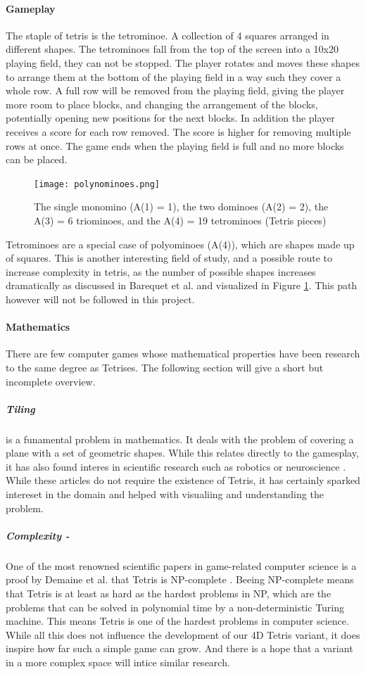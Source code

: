\documentclass{article}
\begin{document}
\paragraph{Gameplay}
The staple of tetris is the tetrominoe. A collection of 4 squares arranged in different shapes. The tetrominoes fall from the top of the screen into a 10x20 playing field, they can not be stopped. The player rotates and moves these shapes to arrange them at the bottom of the playing field in a way such they cover a whole row. A full row will be removed from the playing field, giving the player more room to place blocks, and changing the arrangement of the blocks, potentially opening new positions for the next blocks.
In addition the player receives a score for each row removed. The score is higher for removing multiple rows at once. The game ends when the playing field is full and no more blocks can be placed.
\begin{figure}
    \label{fig:poly}
    \centering
    \texttt{[image: polynominoes.png]}
    \caption{The single monomino (A(1) = 1),
    the two dominoes (A(2) = 2), the A(3) = 6
    triominoes, and the A(4) = 19 tetrominoes
    (Tetris pieces) \cite{polyominoes}}  
\end{figure}
Tetrominoes are a special case of polyominoes (A(4)), which are shapes made up of squares. This is another interesting field of study, and a possible route to increase complexity in tetris, as the number of possible shapes increases dramatically as discussed in Barequet et al.\cite{polyominoes} and visualized in Figure \ref{fig:poly}.
This path however will not be followed in this project.
\paragraph{Mathematics}
There are few computer games whose mathematical properties have been research to the same degree as Tetrises. The following section will give a short but incomplete overview.
\subparagraph*{Tiling} is a funamental problem in mathematics. It deals with the problem of covering a plane with a set of geometric shapes. While this relates directly to the gamesplay, it has also found interes in scientific research such as robotics \cite{tiling1} or neuroscience \cite{tiling2}. While these articles do not require the existence of Tetris, it has certainly sparked intereset in the domain and helped with visualiing and understanding the problem.
\subparagraph*{Complexity - } One of the most renowned scientific papers in game-related computer science is a proof by Demaine et al. that Tetris is NP-complete \cite{tetris_np}. 
Beeing NP-complete means that Tetris is at least as hard as the hardest problems in NP, which are the problems that can be solved in polynomial time by a non-deterministic Turing machine. This means Tetris is one of the hardest problems in computer science.
\newline
\newline
While all this does not influence the development of our 4D Tetris variant, it does inspire how far such a simple game can grow. And there is a hope that a variant in a more complex space will intice similar research.
\end{document}

